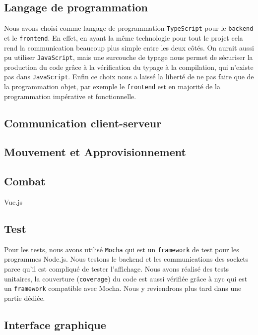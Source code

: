 \subsection{Langage de programmation}

Nous avons choisi comme langage de programmation \lstinline{TypeScript} pour le \lstinline{backend} et le \lstinline{frontend}. En effet, en ayant la même technologie pour tout le projet cela rend la communication beaucoup plus simple entre les deux côtés. On aurait aussi pu utiliser \lstinline{JavaScript}, mais une surcouche de typage nous permet de sécuriser la production du code grâce à la vérification du typage à la compilation, qui n'existe pas dans \lstinline{JavaScript}. Enfin ce choix nous a laissé la liberté de ne pas faire que de la programmation objet, par exemple le \lstinline{frontend} est en majorité de la programmation impérative et fonctionnelle.

\subsection{Communication client-serveur}



\subsection{Mouvement et Approvisionnement}

\subsection{Combat}



Vue.js

\subsection{Test}

Pour les tests, nous avons utilisé {\tt Mocha} qui est un {\tt framework} de test pour les programmes Node.js.
Nous testons le backend et les communications des sockets parce qu'il est compliqué de tester l'affichage.
Nous avons réalisé des tests unitaires, la couverture ({\tt coverage}) du code est aussi vérifiée grâce à nyc qui est un {\tt framework} compatible avec Mocha.
Nous y reviendrons plus tard dans une partie dédiée.

\subsection{Interface graphique}

